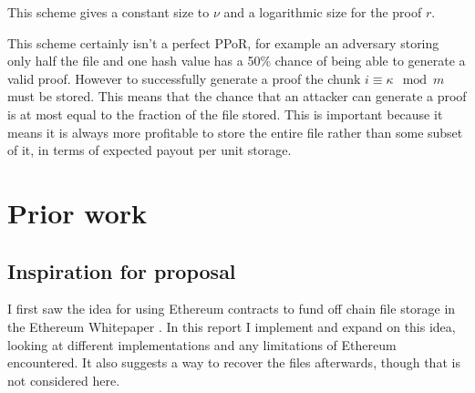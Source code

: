 \documentclass[12pt,a4paper,twoside,openright]{report}
\begin{document}
This scheme gives a constant size to $\nu$ and a logarithmic size for the proof $r$.

This scheme certainly isn't a perfect PPoR, for example an adversary storing only half the file and one hash value has a 50\% chance of being able to generate a valid proof.
However to successfully generate a proof the chunk $i \equiv \kappa \mod m$ must be stored.
This means that the chance that an attacker can generate a proof is at most equal to the fraction of the file stored.
This is important because it means it is always more profitable to store the entire file rather than some subset of it, in terms of expected payout per unit storage.

%
%



%





\section{Prior work}


\subsection{Inspiration for proposal}

I first saw the idea for using Ethereum contracts to fund off chain file storage in the Ethereum Whitepaper \cite{eth-whitepaper}.
In this report I implement and expand on this idea, looking at different implementations and any limitations of Ethereum encountered.
It also suggests a way to recover the files afterwards, though that is not considered here.
\end{document}
